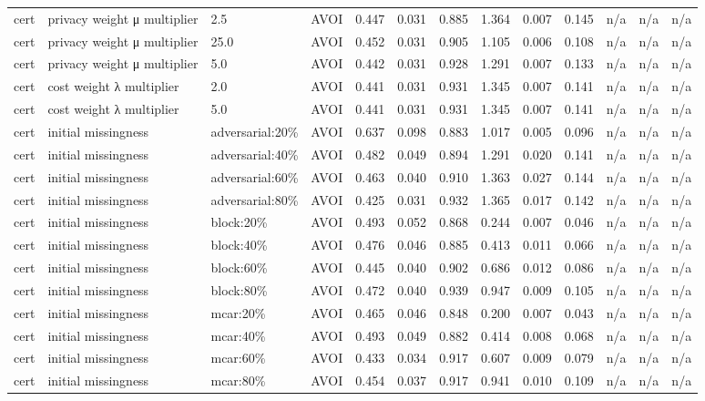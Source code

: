 \begin{table}[!ht]
{\begin{tabular}{lllllllllllll}
cert & privacy weight μ multiplier & 2.5 & AVOI & 0.447 & 0.031 & 0.885 & 1.364 & 0.007 & 0.145 & n/a & n/a & n/a \\
cert & privacy weight μ multiplier & 25.0 & AVOI & 0.452 & 0.031 & 0.905 & 1.105 & 0.006 & 0.108 & n/a & n/a & n/a \\
cert & privacy weight μ multiplier & 5.0 & AVOI & 0.442 & 0.031 & 0.928 & 1.291 & 0.007 & 0.133 & n/a & n/a & n/a \\
cert & cost weight λ multiplier & 2.0 & AVOI & 0.441 & 0.031 & 0.931 & 1.345 & 0.007 & 0.141 & n/a & n/a & n/a \\
cert & cost weight λ multiplier & 5.0 & AVOI & 0.441 & 0.031 & 0.931 & 1.345 & 0.007 & 0.141 & n/a & n/a & n/a \\
cert & initial missingness & adversarial:20\% & AVOI & 0.637 & 0.098 & 0.883 & 1.017 & 0.005 & 0.096 & n/a & n/a & n/a \\
cert & initial missingness & adversarial:40\% & AVOI & 0.482 & 0.049 & 0.894 & 1.291 & 0.020 & 0.141 & n/a & n/a & n/a \\
cert & initial missingness & adversarial:60\% & AVOI & 0.463 & 0.040 & 0.910 & 1.363 & 0.027 & 0.144 & n/a & n/a & n/a \\
cert & initial missingness & adversarial:80\% & AVOI & 0.425 & 0.031 & 0.932 & 1.365 & 0.017 & 0.142 & n/a & n/a & n/a \\
cert & initial missingness & block:20\% & AVOI & 0.493 & 0.052 & 0.868 & 0.244 & 0.007 & 0.046 & n/a & n/a & n/a \\
cert & initial missingness & block:40\% & AVOI & 0.476 & 0.046 & 0.885 & 0.413 & 0.011 & 0.066 & n/a & n/a & n/a \\
cert & initial missingness & block:60\% & AVOI & 0.445 & 0.040 & 0.902 & 0.686 & 0.012 & 0.086 & n/a & n/a & n/a \\
cert & initial missingness & block:80\% & AVOI & 0.472 & 0.040 & 0.939 & 0.947 & 0.009 & 0.105 & n/a & n/a & n/a \\
cert & initial missingness & mcar:20\% & AVOI & 0.465 & 0.046 & 0.848 & 0.200 & 0.007 & 0.043 & n/a & n/a & n/a \\
cert & initial missingness & mcar:40\% & AVOI & 0.493 & 0.049 & 0.882 & 0.414 & 0.008 & 0.068 & n/a & n/a & n/a \\
cert & initial missingness & mcar:60\% & AVOI & 0.433 & 0.034 & 0.917 & 0.607 & 0.009 & 0.079 & n/a & n/a & n/a \\
cert & initial missingness & mcar:80\% & AVOI & 0.454 & 0.037 & 0.917 & 0.941 & 0.010 & 0.109 & n/a & n/a & n/a \\

\end{tabular}}
\end{table}
